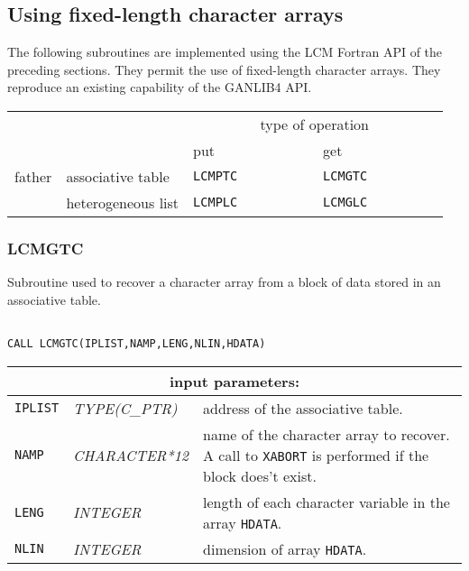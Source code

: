 \vskip 0.8cm

\subsection{Using fixed-length character arrays}

The following subroutines are implemented using the LCM Fortran API of the preceding sections. They
permit the use of fixed-length character arrays. They reproduce an existing capability of the GANLIB4 API.

\vskip 0.4cm

\begin{center}
\begin{tabular}{|c|l|l|l|}
\cline{3-4}
\multicolumn{2}{c|}{} & \multicolumn{2}{c|}{type of operation} \\
\cline{3-4}
\multicolumn{2}{c|}{} & put~~~~~~~~~~~~~ & get~~~~~~~~~~~~~ \\
\hline
father & associative table & {\tt LCMPTC} & {\tt LCMGTC} \\
\cline{2-4}
       & heterogeneous list & {\tt LCMPLC} & {\tt LCMGLC} \\
\hline
\end{tabular}
\end{center}

\subsubsection{LCMGTC}\label{sect:LCMGTC}

Subroutine used to recover a character array from a block of data stored in an associative table.

\begin{verbatim}

CALL LCMGTC(IPLIST,NAMP,LENG,NLIN,HDATA)
\end{verbatim}

\noindent
\begin{tabular}{|p{1.5cm}|p{3cm}|p{10cm}|}
\hline
\multicolumn{3}{|c|}{\bf input parameters:} \\
\hline
{\tt IPLIST} & {\it TYPE(C\_PTR)} & address of the associative table. \\
\hline
{\tt NAMP} & {\it CHARACTER*12} &  name of the character array
to recover. A call to {\tt XABORT} is performed if the block does't exist. \\
\hline
{\tt LENG} & {\it INTEGER} & length of each character variable in the array {\tt HDATA}. \\
\hline
{\tt NLIN} & {\it INTEGER} & dimension of array {\tt HDATA}. \\
\hline
\end{tabular}

